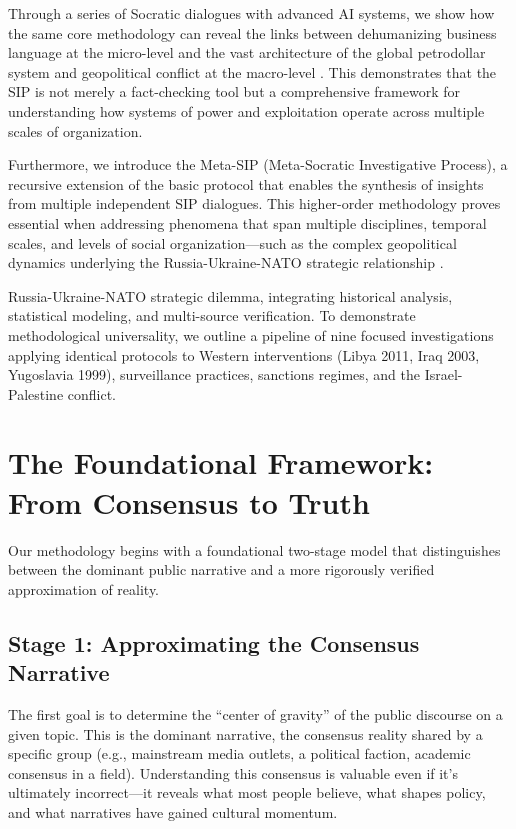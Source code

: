 \documentclass[11pt,a4paper]{article}
\begin{document}
Through a series of Socratic dialogues with advanced AI systems, we show how the same core methodology can reveal the links between dehumanizing business language at the micro-level and the vast architecture of the global petrodollar system and geopolitical conflict at the macro-level \citep{itog_dialogue}. This demonstrates that the SIP is not merely a fact-checking tool but a comprehensive framework for understanding how systems of power and exploitation operate across multiple scales of organization.

Furthermore, we introduce the Meta-SIP (Meta-Socratic Investigative Process), a recursive extension of the basic protocol that enables the synthesis of insights from multiple independent SIP dialogues. This higher-order methodology proves essential when addressing phenomena that span multiple disciplines, temporal scales, and levels of social organization---such as the complex geopolitical dynamics underlying the Russia-Ukraine-NATO strategic relationship \citep{metasip_dialogue}.

Russia-Ukraine-NATO strategic dilemma, integrating historical 
analysis, statistical modeling, and multi-source verification. To 
demonstrate methodological universality, we outline a pipeline of 
nine focused investigations applying identical protocols to Western 
interventions (Libya 2011, Iraq 2003, Yugoslavia 1999), surveillance 
practices, sanctions regimes, and the Israel-Palestine conflict.

\section{The Foundational Framework: From Consensus to Truth}

Our methodology begins with a foundational two-stage model that distinguishes between the dominant public narrative and a more rigorously verified approximation of reality.

\subsection{Stage 1: Approximating the Consensus Narrative}

The first goal is to determine the ``center of gravity'' of the public discourse on a given topic. This is the dominant narrative, the consensus reality shared by a specific group (e.g., mainstream media outlets, a political faction, academic consensus in a field). Understanding this consensus is valuable even if it's ultimately incorrect---it reveals what most people believe, what shapes policy, and what narratives have gained cultural momentum.
\end{document}
